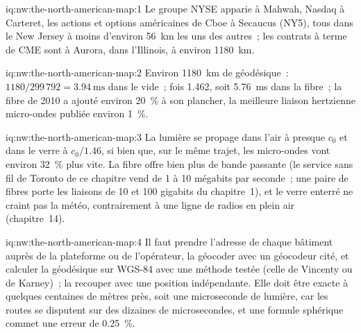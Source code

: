 \begin{solution}{iq:nw:the-north-american-map:1}
Le groupe NYSE apparie à Mahwah, Nasdaq à Carteret, les actions et options américaines de Cboe à Secaucus (NY5), tous dans le New Jersey à moins d'environ
\qty{56}{\kilo\metre} les uns des autres~; les contrats à terme de CME sont à Aurora, dans l'Illinois, à environ \qty{1180}{\kilo\metre}.
\end{solution}

\begin{solution}{iq:nw:the-north-american-map:2}
Environ \qty{1180}{\kilo\metre} de géodésique~: $1180/299\,792 = \qty{3.94}{\milli\second}$ dans le vide~; fois 1.462, soit \qty{5.76}{\milli\second} dans la fibre~;
la fibre de 2010 a ajouté environ 20~\% à son plancher, la meilleure liaison hertzienne micro-ondes publiée environ 1~\%.
\end{solution}

\begin{solution}{iq:nw:the-north-american-map:3}
La lumière se propage dans l'air à presque $c_0$ et dans le verre à $c_0/1.46$, si bien que, sur le même trajet, les micro-ondes vont environ 32~\% plus vite. La fibre offre bien plus
de bande passante (le service sans fil de Toronto de ce chapitre vend de 1 à 10 mégabits par seconde~; une paire de fibres porte les liaisons
de 10 et 100 gigabits du chapitre~1), et le verre enterré ne craint pas la météo, contrairement à une ligne de radios en plein air (chapitre~14).
\end{solution}

\begin{solution}{iq:nw:the-north-american-map:4}
Il faut prendre l'adresse de chaque bâtiment auprès de la plateforme ou de l'opérateur, la géocoder avec un géocodeur cité, et calculer la géodésique sur WGS-84 avec
une méthode testée (celle de Vincenty ou de Karney)~; la recouper avec une position indépendante. Elle doit être exacte à quelques centaines de mètres près, soit une microseconde de
lumière, car les routes se disputent sur des dizaines de microsecondes, et une formule sphérique commet une erreur de 0.25~\%.
\end{solution}

